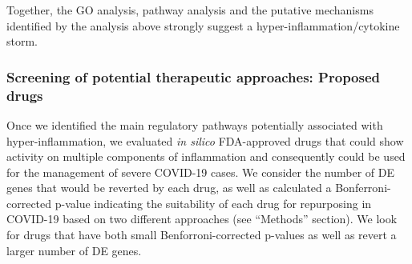 Together, the GO analysis, pathway analysis and the putative mechanisms identified by the analysis above strongly  suggest a hyper-inflammation/cytokine storm.
\color{black} 

\subsubsection{Screening of potential therapeutic approaches: Proposed drugs}  

Once we identified the main regulatory pathways potentially associated with hyper-inflammation, we evaluated \emph{in silico} FDA-approved drugs that could show activity on multiple components of inflammation and consequently could be used for the management of severe COVID-19 cases. We consider the number of DE genes that would be reverted by each drug, as well as calculated a Bonferroni-corrected p-value indicating the suitability of each drug for repurposing in COVID-19 based on two different approaches (see ``Methods'' section). We look for drugs that have both small Benforroni-corrected p-values as well as revert a larger number of DE genes. 
%
%


